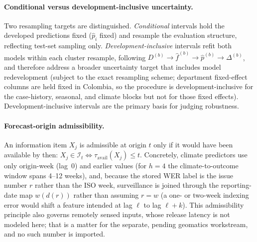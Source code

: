 \documentclass[11pt,a4paper]{article}
\begin{document}
\paragraph{Conditional versus development-inclusive uncertainty.}
Two resampling targets are distinguished. \emph{Conditional} intervals hold the developed predictions fixed ($\hat p_i$ fixed) and resample the evaluation structure, reflecting test-set sampling only. \emph{Development-inclusive} intervals refit both models within each cluster resample, following $D^{(b)}\to\hat f^{(b)}\to\hat p^{(b)}\to\Delta^{(b)}$, and therefore address a broader uncertainty target that includes model redevelopment (subject to the exact resampling scheme; department fixed-effect columns are held fixed in Colombia, so the procedure is development-inclusive for the case-history, seasonal, and climate blocks but not for those fixed effects). Development-inclusive intervals are the primary basis for judging robustness.

\paragraph{Forecast-origin admissibility.}
An information item $X_j$ is admissible at origin $t$ only if it would have been available by then: $X_j\in\mathcal I_t \iff \tau_{\mathrm{avail}}(X_j)\le t$. Concretely, climate predictors use only origin-week (lag~0) and earlier values (for $h=4$ the climate-to-outcome window spans 4--12 weeks), and, because the stored WER label is the issue number $r$ rather than the ISO week, surveillance is joined through the reporting-date map $w(d(r))$ rather than assuming $r=w$ (a one- or two-week indexing error would shift a feature intended at lag $\ell$ to lag $\ell+k$). This admissibility principle also governs remotely sensed inputs, whose release latency is not modeled here; that is a matter for the separate, pending geomatics workstream, and no such number is imported.
\end{document}
